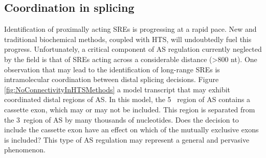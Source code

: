 
\subsection{Coordination in splicing}



Identification of proximally acting SREs is progressing at a rapid pace. New and traditional biochemical methods, coupled with HTS, will undoubtedly fuel this progress. Unfortunately, a critical component of AS regulation currently neglected by the field is that of SREs acting across a considerable distance (>800 nt). One observation that may lead to the identification of long-range SREs is intramolecular coordination between distal splicing decisions. Figure \ref{fig:NoConnectivityInHTSMethods} a model transcript that may exhibit coordinated distal regions of AS. In this model, the 5\textprime~ region of AS contains a cassette exon, which may or may not be included. This region is separated from the 3\textprime~region of AS by many thousands of nucleotides. Does the decision to include the cassette exon have an effect on which of the mutually exclusive exons is included? This type of AS regulation may represent a general and pervasive phenomenon.

